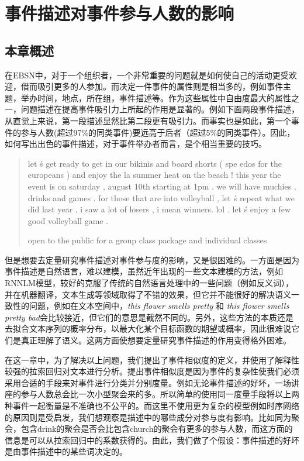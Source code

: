 % 
\section{事件描述对事件参与人数的影响} 
\subsection{本章概述} 
在$\mathrm{EBSN}$中，对于一个组织者，一个非常重要的问题就是如何使自己的活动更受欢迎，借而吸引更多的人参加。而决定一件事件的属性则是相当多的，例如事件主题，举办时间，地点，所在组，事件描述等。作为这些属性中自由度最大的属性之一，问题描述在提高事件吸引力上所起的作用是显著的。例如下面两段事件描述，从直觉上来说，第一段描述显然比第二段更有吸引力。而事实也是如此，第一个事件的参与人数(超过97\%的同类事件)要远高于后者（超过5\%的同类事件）。因此，如何写出出色的事件描述，对于事件举办者而言，是个相当重要的技巧。
 
\begin{quotation}
  let  \'s get ready to get in our bikinis and board shorts  (  spe
  edos for the europeans  )  and enjoy the la summer heat on the beach
  !  this year the event is on saturday  ,  august 10th starting at 
  1pm . we will have muchies  ,  drinks and games . for those that 
  are into volleyball  ,  let  \'s repeat what we did last year . 
  i saw a lot of losers  ,  i mean winners. lol . let  \'s enjoy 
  a few good volleyball game .
    
  open to the public for a group class package and individual classes
\end{quotation}

但是想要去定量研究事件描述对事件参与度的影响，又是很困难的。一方面是因为事件描述是自然语言，难以建模，虽然近年出现的一些文本建模的方法，例如RNNLM模型，较好的克服了传统的自然语言处理中的一些问题（例如反义词），并在机器翻译，文本生成等领域取得了不错的效果，但它并不能很好的解决语义一致性的问题，例如在文本空间中，\textit{this flower smells pretty} 和 \textit{this flower smells pretty bad}会比较接近，但它们的意思是截然不同的。另外，这些方法的本质还是去拟合文本序列的概率分布，以最大化某个目标函数的期望或概率，因此很难说它们是真正理解了语义。这两方面使想要定量研究事件描述的作用变得格外困难。

在这一章中，为了解决以上问题，我们提出了事件相似度的定义，并使用了解释性较强的拉索回归对文本进行分析。提出事件相似度是因为事件的复杂性使我们必须采用合适的手段来对事件进行分类并分别度量。例如无论事件描述的好坏，一场讲座的参与人数总会比一次小型聚会来的多。所以简单的使用同一度量手段将以上两种事件一起衡量是不准确也不公平的。而这里不使用更为复杂的模型例如时序网络的原因则是受\citep{noauthor_predicting_nodate}启发，我们想观察是描述中的哪些成分对参与度有影响。比如同为聚会，包含drink的聚会是否会比包含church的聚会有更多的参与人数，而这方面的信息是可以从拉索回归中的系数获得的。由此，我们做了个假设：事件描述的好坏是由事件描述中的某些词决定的。

